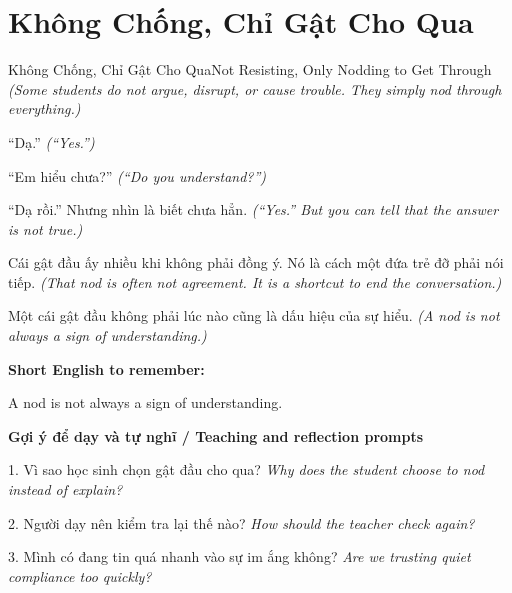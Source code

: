 \section{Không Chống, Chỉ Gật Cho Qua}
\begin{truyen}{Không Chống, Chỉ Gật Cho Qua}{Not Resisting, Only Nodding to Get Through}
\textit{(Some students do not argue, disrupt, or cause trouble. They simply nod through everything.)}

“Dạ.”
\textit{(“Yes.”)}

“Em hiểu chưa?”
\textit{(“Do you understand?”)}

“Dạ rồi.” Nhưng nhìn là biết chưa hẳn.
\textit{(“Yes.” But you can tell that the answer is not true.)}

Cái gật đầu ấy nhiều khi không phải đồng ý. Nó là cách một đứa trẻ đỡ phải nói tiếp.
\textit{(That nod is often not agreement. It is a shortcut to end the conversation.)}

\end{truyen}

\begin{baihoc}
Một cái gật đầu không phải lúc nào cũng là dấu hiệu của sự hiểu.
\textit{(A nod is not always a sign of understanding.)}
\end{baihoc}

\begin{ghinhoanh}
\textbf{Short English to remember:}

A nod is not always a sign of understanding.

\end{ghinhoanh}

\begin{tuhocnhanh}
\textbf{Gợi ý để dạy và tự nghĩ / Teaching and reflection prompts}

1. Vì sao học sinh chọn gật đầu cho qua? \textit{Why does the student choose to nod instead of explain?}

2. Người dạy nên kiểm tra lại thế nào? \textit{How should the teacher check again?}

3. Mình có đang tin quá nhanh vào sự im ắng không? \textit{Are we trusting quiet compliance too quickly?}
\end{tuhocnhanh}
\ngancach

